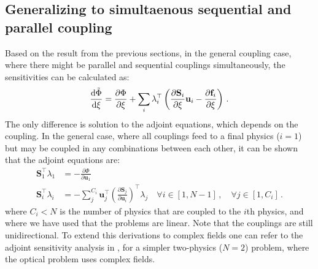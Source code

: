 \subsection{Generalizing to simultaenous sequential and parallel coupling}
Based on the result from the previous sections, in the general coupling case, where there might be parallel and sequential couplings simultaneously, the sensitivities can be calculated as:
\begin{equation}
    \frac{\mathop{}\!\text{d} \tilde{\Phi}}{\mathop{}\!\text{d} \xi} = \frac{\partial \Phi}{\partial \xi} + \sum_i \lambda_{i}^{\top} \left( \frac{\partial \mathbf{S}_i}{\partial \xi} \mathbf{u}_i - \frac{\partial \mathbf{f}_i}{\partial \xi} \right)\,.
\end{equation}
The only difference is solution to the adjoint equations, which depends on the coupling. In the general case, where all couplings feed to a 
final physics ($i=1$) but may be coupled in any combinations between each other, it can be shown that the adjoint equations are:
\begin{align}
    \mathbf{S}^\top_{1}\lambda_{1} &= - \frac{\partial \Phi}{\partial \mathbf{u}_{1}}\,\\
    \mathbf{S}^\top_{i}\lambda_{i} &= - \sum^{C_i}_j \mathbf{u}^\top_j \left(\frac{\partial \mathbf{S}_j}{\partial \mathbf{u}_{i}}\right)^\top \lambda_j \quad \forall i \in [1, N-1]\, , \quad \forall j \in [1, C_i] \,.
\end{align}
where $C_i<N$ is the number of physics that are coupled to the $i$th physics, and where we have used that the problems are linear. 
Note that the couplings are still unidirectional. To extend this derivations to complex fields one can refer to the adjoint sensitivity
analysis in \cite{ownpub0}, for a simpler two-physics ($N=2$) problem, where the optical problem uses complex fields.

